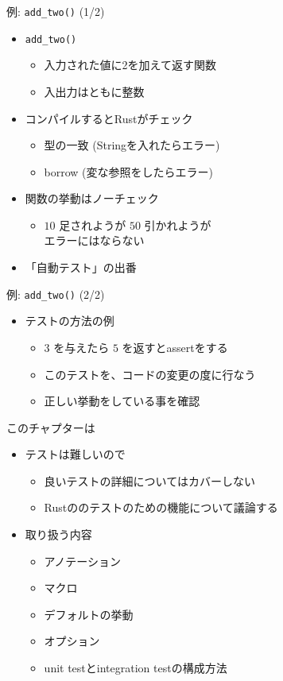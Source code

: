 \documentclass[cjk,14pt,xcolor=dvipsnames,table,dvipdfmx,professional font,t,fragile]{beamer}
\begin{document}
\begin{frame}{例: \texttt{add\_two()} (1/2)}
 \begin{itemize}
  \item \texttt{add\_two()}
	\begin{itemize}
	 \item 入力された値に2を加えて返す関数
	 \item 入出力はともに整数
	\end{itemize}
  \item コンパイルするとRustがチェック
	\begin{itemize}
	 \item 型の一致 (Stringを入れたらエラー)
	 \item borrow (変な参照をしたらエラー)
	\end{itemize}
  \item 関数の挙動はノーチェック
	\begin{itemize}
	 \item $10$ 足されようが $50$ 引かれようが\\
	       エラーにはならない
	\end{itemize}
  \item 「自動テスト」の出番
 \end{itemize}
\end{frame}

\begin{frame}{例: \texttt{add\_two()} (2/2)}
 \begin{itemize}
  \item テストの方法の例
	\begin{itemize}
	 \item $3$ を与えたら $5$ を返すとassertをする
	 \item このテストを、コードの変更の度に行なう
	 \item 正しい挙動をしている事を確認
	\end{itemize}
 \end{itemize}
\end{frame}

\begin{frame}{このチャプターは}
 \begin{itemize}
  \item テストは難しいので
	\begin{itemize}
	 \item 良いテストの詳細についてはカバーしない
	 \item Rustののテストのための機能について議論する
	\end{itemize}
  \item 取り扱う内容
	\begin{itemize}
	 \item アノテーション
	 \item マクロ
	 \item デフォルトの挙動
	 \item オプション
	 \item unit testとintegration testの構成方法
	\end{itemize}
 \end{itemize}
\end{frame}
\end{document}
